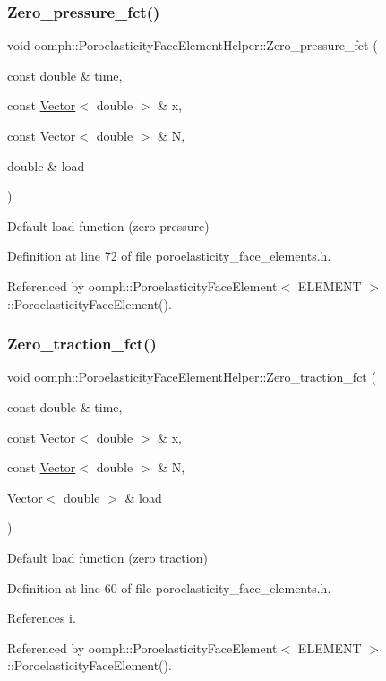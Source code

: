 \subsubsection{\texorpdfstring{Zero\+\_\+pressure\+\_\+fct()}{Zero\_pressure\_fct()}}
{\footnotesize\ttfamily void oomph\+::\+Poroelasticity\+Face\+Element\+Helper\+::\+Zero\+\_\+pressure\+\_\+fct (\begin{DoxyParamCaption}\item[{const double \&}]{time,  }\item[{const \hyperlink{classoomph_1_1Vector}{Vector}$<$ double $>$ \&}]{x,  }\item[{const \hyperlink{classoomph_1_1Vector}{Vector}$<$ double $>$ \&}]{N,  }\item[{double \&}]{load }\end{DoxyParamCaption})}



Default load function (zero pressure) 



Definition at line 72 of file poroelasticity\+\_\+face\+\_\+elements.\+h.



Referenced by oomph\+::\+Poroelasticity\+Face\+Element$<$ E\+L\+E\+M\+E\+N\+T $>$\+::\+Poroelasticity\+Face\+Element().

\mbox{\label{namespaceoomph_1_1PoroelasticityFaceElementHelper_a488acda61b46c3a3fe9e18339160c745}} 
\subsubsection{\texorpdfstring{Zero\+\_\+traction\+\_\+fct()}{Zero\_traction\_fct()}}
{\footnotesize\ttfamily void oomph\+::\+Poroelasticity\+Face\+Element\+Helper\+::\+Zero\+\_\+traction\+\_\+fct (\begin{DoxyParamCaption}\item[{const double \&}]{time,  }\item[{const \hyperlink{classoomph_1_1Vector}{Vector}$<$ double $>$ \&}]{x,  }\item[{const \hyperlink{classoomph_1_1Vector}{Vector}$<$ double $>$ \&}]{N,  }\item[{\hyperlink{classoomph_1_1Vector}{Vector}$<$ double $>$ \&}]{load }\end{DoxyParamCaption})}



Default load function (zero traction) 



Definition at line 60 of file poroelasticity\+\_\+face\+\_\+elements.\+h.



References i.



Referenced by oomph\+::\+Poroelasticity\+Face\+Element$<$ E\+L\+E\+M\+E\+N\+T $>$\+::\+Poroelasticity\+Face\+Element().

